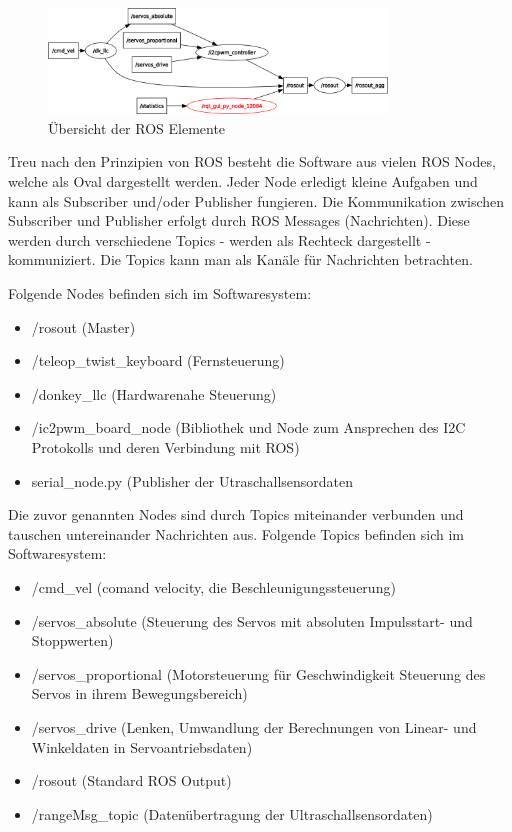 \documentclass[conference]{IEEEtran}
\begin{document}
	\begin{figure}[!ht] 
		\centering
		\includegraphics[width=9cm]{img/rosgraph.png}
		\caption{Übersicht der ROS Elemente}
		\label{rosgraph}
	\end{figure}
	
	Treu nach den Prinzipien von ROS besteht die Software aus vielen ROS Nodes, welche als Oval dargestellt werden. 
	Jeder Node erledigt kleine Aufgaben und kann als Subscriber und/oder Publisher fungieren. Die Kommunikation zwischen Subscriber und Publisher erfolgt durch ROS Messages (Nachrichten). Diese werden durch verschiedene Topics - werden als Rechteck dargestellt - kommuniziert. Die Topics kann man als Kanäle für Nachrichten betrachten.
	
	Folgende Nodes befinden sich im Softwaresystem:
	\begin{itemize}
		\item /rosout (Master)
		\item /teleop\_twist\_keyboard (Fernsteuerung)
		\item /donkey\_llc (Hardwarenahe Steuerung)
		\item /ic2pwm\_board\_node (Bibliothek und Node zum Ansprechen des I2C Protokolls und deren Verbindung mit ROS)
		\item serial\_node.py (Publisher der Utraschallsensordaten
	\end{itemize}
	
	Die zuvor genannten Nodes sind durch Topics miteinander verbunden und tauschen untereinander Nachrichten aus. Folgende Topics befinden sich im Softwaresystem:
	\begin{itemize}
		\item /cmd\_vel (comand velocity, die Beschleunigungssteuerung)
		\item /servos\_absolute (Steuerung des Servos mit absoluten Impulsstart- und Stoppwerten)
		\item /servos\_proportional (Motorsteuerung für Geschwindigkeit Steuerung des Servos in ihrem Bewegungsbereich)
		\item /servos\_drive (Lenken, Umwandlung der Berechnungen von Linear- und Winkeldaten in Servoantriebsdaten)
		\item /rosout (Standard ROS Output)
		\item /rangeMsg\_topic (Datenübertragung der Ultraschallsensordaten)
	\end{itemize}
	
\end{document}
